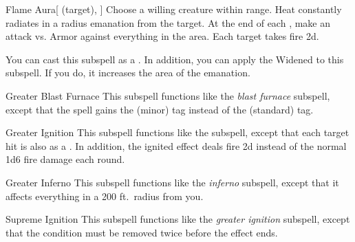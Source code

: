 \begin{ability}[\nth{4}]{Flame Aura}[ (target), ]
Choose a willing creature within \rngclose range.
Heat constantly radiates in a \areamed radius emanation from the target.
At the end of each , make an attack vs. Armor against everything in the area.
\hit Each target takes fire  \minus2d.

You can cast this subspell as a .
In addition, you can apply the Widened  to this subspell.
If you do, it increases the area of the emanation.
\end{ability}
\vspace{0.25em}



\begin{ability}[\nth{4}]{Greater Blast Furnace}
This subspell functions like the \textit{blast furnace} subspell, except that the spell gains the  (minor) tag instead of the  (standard) tag.
\end{ability}
\vspace{0.25em}



\begin{ability}[\nth{4}]{Greater Ignition}
This subspell functions like the  subspell, except that each target hit is also  as a .
In addition, the ignited effect deals fire  \minus2d instead of the normal 1d6 fire damage each round.
\end{ability}
\vspace{0.25em}



\begin{ability}[\nth{5}]{Greater Inferno}
This subspell functions like the \textit{inferno} subspell, except that it affects everything in a 200 ft.\ radius from you.
\end{ability}
\vspace{0.25em}



\begin{ability}[\nth{6}]{Supreme Ignition}
This subspell functions like the \textit{greater ignition} subspell, except that the condition must be removed twice before the effect ends.
\end{ability}
\vspace{0.25em}


